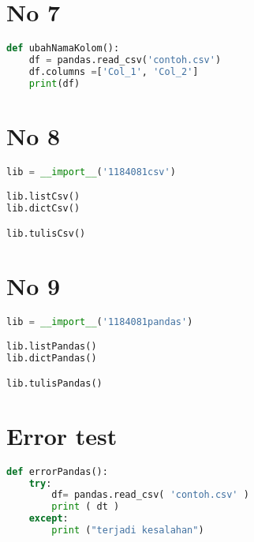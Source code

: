 \section*{No 7}
\begin{lstlisting}[language=Python]
def ubahNamaKolom():
    df = pandas.read_csv('contoh.csv')
    df.columns =['Col_1', 'Col_2'] 
    print(df)

\end{lstlisting}
\section*{No 8}
\begin{lstlisting}[language=Python]
lib = __import__('1184081csv')

lib.listCsv()
lib.dictCsv()

lib.tulisCsv()
\end{lstlisting}
\section*{No 9}
\begin{lstlisting}[language=Python]
lib = __import__('1184081pandas')

lib.listPandas()
lib.dictPandas()

lib.tulisPandas()
\end{lstlisting}

\section*{Error test}
\begin{lstlisting}[language=Python]
def errorPandas(): 
    try:
        df= pandas.read_csv( 'contoh.csv' ) 
        print ( dt ) 
    except: 
        print ("terjadi kesalahan")
\end{lstlisting}